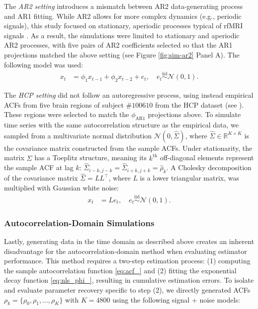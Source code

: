 \documentclass[docs/main.tex]{subfiles}
\begin{document}
The \textit{AR2 setting} introduces a mismatch between AR2 data-generating process and AR1 fitting. While AR2 allows for more complex dynamics (e.g., periodic signals), this study focused on stationary, aperiodic processes typical of rfMRI signals \citep{he_scale-free_2011}. As a result, the simulations were limited to stationary and aperiodic AR2 processes, with five pairs of AR2 coefficients selected so that the AR1 projections matched the above setting (see Figure \ref{fig:sim-ar2} Panel A). The following model was used:
\begin{align}
    x_t &= \phi_1 x_{t-1} + \phi_2 x_{t-2} + e_t, \quad e_t \overset{\text{iid}}{\sim} \mathcal{N}(0, 1).
\end{align}

The \textit{HCP setting} did not follow an autoregressive process, using instead empirical ACFs from five brain regions of subject $\#100610$ from the HCP dataset (see ). These regions were selected to match the $\phi_\text{AR1}$ projections above. To simulate time series with the same autocorrelation structure as the empirical data, we sampled from a multivariate normal distribution $\mathcal{N}(0, \hat\Sigma)$, where $\hat\Sigma \in \mathbb{R}^{K\times K}$ is the covariance matrix constructed from the sample ACFs. Under stationarity, the matrix $\hat\Sigma$ has a Toeplitz structure, meaning its $k^\text{th}$ off-diagonal elements represent the sample ACF at lag $k$: $\hat\Sigma_{i-k, j-k} = \hat\Sigma_{i+k, j+k} = \hat\rho_k$. A Cholesky decomposition of the covariance matrix $\hat\Sigma = LL^{\top}$, where $L$ is a lower triangular matrix, was multiplied with Gaussian white noise:
\begin{align}
    x_t &= L e_t, \quad e_t \overset{\text{iid}}{\sim} \mathcal{N}(0, 1).
\end{align}

\subsubsection{Autocorrelation-Domain Simulations}
Lastly, generating data in the time domain as described above creates an inherent disadvantage for the autocorrelation-domain method when evaluating estimator performance. This method requires a two-step estimation process: (1) computing the sample autocorrelation function \eqref{eq:acf_} and (2) fitting the exponential decay function \eqref{eq:nls_phi_}, resulting in cumulative estimation errors. To isolate and evaluate parameter recovery specific to step (2), we directly generated ACFs $\rho_k = \{\rho_0, \rho_1, ..., \rho_K\}$ with $K=4800$ using the following signal + noise models:
\end{document}

